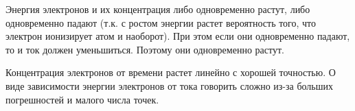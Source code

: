 \begin{figure}[ht!]
\end{figure}
\begin{figure}[ht!]
\end{figure}
Энергия электронов и их концентрация либо одновременно растут, либо одновременно падают (т.к. с ростом энергии растет вероятность того, что электрон ионизирует атом и наоборот). При этом если они одновременно падают, то и ток должен уменьшиться. Поэтому они одновременно растут.

Концентрация электронов от времени растет линейно с хорошей точностью. О виде зависимости энергии электронов от тока говорить сложно из-за больших погрешностей и малого числа точек.
